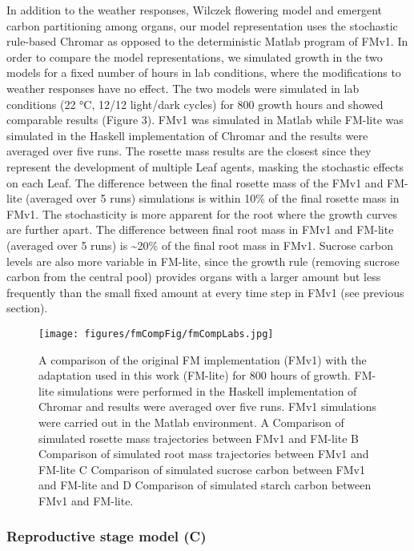 \documentclass[phd]{infthesis}
\begin{document}
In addition to the weather responses, Wilczek flowering model and
emergent carbon partitioning among organs, our model representation uses
the stochastic rule-based Chromar as opposed to the deterministic Matlab
program of FMv1. In order to compare the model representations, we
simulated growth in the two models for a fixed number of hours in lab
conditions, where the modifications to weather responses have no effect.
The two models were simulated in lab conditions (22 °C, 12/12 light/dark
cycles) for \(800\) growth hours and showed comparable results (Figure
3). FMv1 was simulated in Matlab while FM-lite was simulated in the
Haskell implementation of Chromar and the results were averaged over
five runs. The rosette mass results are the closest since they represent
the development of multiple Leaf agents, masking the stochastic effects
on each Leaf. The difference between the final rosette mass of the FMv1
and FM-lite (averaged over 5 runs) simulations is within 10\% of the
final rosette mass in FMv1. The stochasticity is more apparent for the
root where the growth curves are further apart. The difference between
final root mass in FMv1 and FM-lite (averaged over 5 runs) is
\textasciitilde{}20\% of the final root mass in FMv1. Sucrose carbon
levels are also more variable in FM-lite, since the growth rule
(removing sucrose carbon from the central pool) provides organs with a
larger amount but less frequently than the small fixed amount at every
time step in FMv1 (see previous section).

\begin{figure}[tb]
  \centering
  \texttt{[image: figures/fmCompFig/fmCompLabs.jpg]}
  \caption{A comparison of the original FM implementation (FMv1) with the
    adaptation used in this work (FM-lite) for 800 hours of growth. FM-lite
    simulations were performed in the Haskell implementation of Chromar and
    results were averaged over five runs. FMv1 simulations were carried out in
    the Matlab environment. A Comparison of simulated rosette mass trajectories
    between FMv1 and FM-lite B Comparison of simulated root mass trajectories
    between FMv1 and FM-lite C Comparison of simulated sucrose carbon between
    FMv1 and FM-lite and D Comparison of simulated starch carbon between FMv1
    and FM-lite.}
  \label{fig:comp}
\end{figure}



\subsubsection{Reproductive stage model (C)}
\label{reproductive-stage-model-c}
\end{document}
